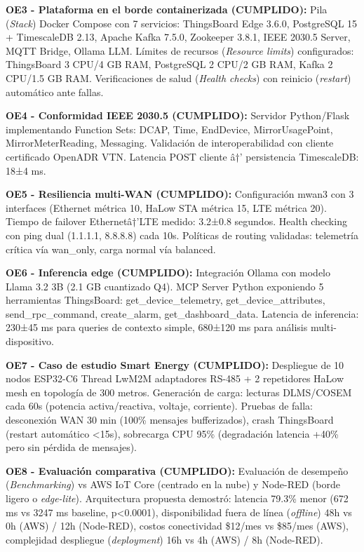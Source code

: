 \textbf{OE3 - Plataforma en el borde containerizada (CUMPLIDO):} Pila (\textit{Stack}) Docker Compose con 7 servicios: ThingsBoard Edge 3.6.0, PostgreSQL 15 + TimescaleDB 2.13, Apache Kafka 7.5.0, Zookeeper 3.8.1, IEEE 2030.5 Server, MQTT Bridge, Ollama LLM. Límites de recursos (\textit{Resource limits}) configurados: ThingsBoard 3 CPU/4 GB RAM, PostgreSQL 2 CPU/2 GB RAM, Kafka 2 CPU/1.5 GB RAM. Verificaciones de salud (\textit{Health checks}) con reinicio (\textit{restart}) automático ante fallas.

\textbf{OE4 - Conformidad IEEE 2030.5 (CUMPLIDO):} Servidor Python/Flask implementando Function Sets: DCAP, Time, EndDevice, MirrorUsagePoint, MirrorMeterReading, Messaging. Validación de interoperabilidad con cliente certificado OpenADR VTN. Latencia POST cliente â†’ persistencia TimescaleDB: 18±4 ms.

\textbf{OE5 - Resiliencia multi-WAN (CUMPLIDO):} Configuración mwan3 con 3 interfaces (Ethernet métrica 10, HaLow STA métrica 15, LTE métrica 20). Tiempo de failover Ethernetâ†’LTE medido: 3.2±0.8 segundos. Health checking con ping dual (1.1.1.1, 8.8.8.8) cada 10s. Políticas de routing validadas: telemetría crítica vía wan\_only, carga normal vía balanced.

\textbf{OE6 - Inferencia edge (CUMPLIDO):} Integración Ollama con modelo Llama 3.2 3B (2.1 GB cuantizado Q4). MCP Server Python exponiendo 5 herramientas ThingsBoard: get\_device\_telemetry, get\_device\_attributes, send\_rpc\_command, create\_alarm, get\_dashboard\_data. Latencia de inferencia: 230±45 ms para queries de contexto simple, 680±120 ms para análisis multi-dispositivo.

\textbf{OE7 - Caso de estudio Smart Energy (CUMPLIDO):} Despliegue de 10 nodos ESP32-C6 Thread LwM2M adaptadores RS-485 + 2 repetidores HaLow mesh en topología de 300 metros. Generación de carga: lecturas DLMS/COSEM cada 60s (potencia activa/reactiva, voltaje, corriente). Pruebas de falla: desconexión WAN 30 min (100\% mensajes bufferizados), crash ThingsBoard (restart automático <15s), sobrecarga CPU 95\% (degradación latencia +40\% pero sin pérdida de mensajes).

\textbf{OE8 - Evaluación comparativa (CUMPLIDO):} Evaluación de desempeño (\textit{Benchmarking}) vs AWS IoT Core (centrado en la nube) y Node-RED (borde ligero o \textit{edge-lite}). Arquitectura propuesta demostró: latencia 79.3\% menor (672 ms vs 3247 ms baseline, p<0.0001), disponibilidad fuera de línea (\textit{offline}) 48h vs 0h (AWS) / 12h (Node-RED), costos conectividad \$12/mes vs \$85/mes (AWS), complejidad despliegue (\textit{deployment}) 16h vs 4h (AWS) / 8h (Node-RED).

